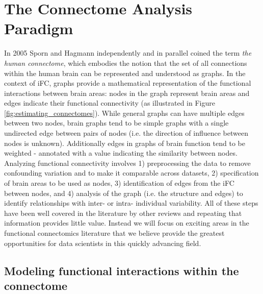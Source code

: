 \documentclass{bmcart}
\begin{document}
\section{The Connectome Analysis Paradigm}

In 2005 Sporn and Hagmann \cite{Sporns2005,Hagmann2005} independently and in parallel coined the term \textit{the human connectome}, which embodies the notion that the set of all connections within the human brain can be represented and understood as graphs. In the context of iFC, graphs provide a mathematical representation of the functional interactions between brain areas: nodes in the graph represent brain areas and edges indicate their functional connectivity (as illustrated in Figure \ref{fig:estimating_connectomes}). While general graphs can have multiple edges between two nodes, brain graphs tend to be simple graphs with a single undirected edge between pairs of nodes (i.e. the direction of influence between nodes is unknown). Additionally edges in graphs of brain function tend to be weighted - annotated with a value indicating the similarity between nodes. Analyzing functional connectivity involves 1) preprocessing the data to remove confounding variation and to make it comparable across datasets, 2) specification of brain areas to be used as nodes, 3) identification of edges from the iFC between nodes, and 4) analysis of the graph (i.e. the structure and edges) to identify relationships with inter- or intra- individual variability. All of these steps have been well covered in the literature by other reviews \cite{Craddock2013,Kelly2012,Varoquaux2013} and repeating that information provides little value. Instead we will focus on exciting areas in the functional connectomics literature that we believe provide the greatest opportunities for data scientists in this quickly advancing field.

\subsection{Modeling functional interactions within the connectome}
\end{document}

